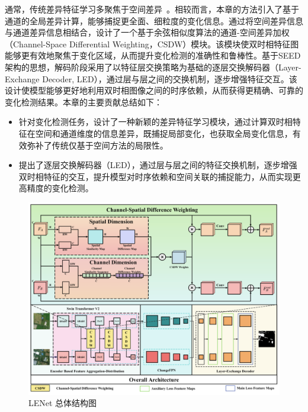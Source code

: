 通常，传统差异特征学习多聚焦于空间差异~\cite{dong_changeclip_2024, feng_change_2023, shi_deeply_2022}。相较而言，本章的方法引入了基于通道的全局差异计算，能够捕捉更全面、细粒度的变化信息。通过将空间差异信息与通道差异信息相结合，设计了一个基于余弦相似度算法的通道-空间差异加权（Channel-Space Differential Weighting，CSDW）模块。该模块使双时相特征图能够更有效地聚焦于变化区域，从而提升变化检测的准确性和鲁棒性。基于SEED架构的思想，解码阶段采用了以特征层交换策略为基础的逐层交换解码器（Layer-Exchange Decoder, LED），通过层与层之间的交换机制，逐步增强特征交互。该设计使模型能够更好地利用双时相图像之间的时序依赖，从而获得更精确、可靠的变化检测结果。本章的主要贡献总结如下：

\begin{itemize}
  \item 针对变化检测任务，设计了一种新颖的差异特征学习模块，通过计算双时相特征在空间和通道维度的信息差异，既捕捉局部变化，也获取全局变化信息，有效弥补了传统仅基于空间方法的局限性。
  \item 提出了逐层交换解码器（LED），通过层与层之间的特征交换机制，逐步增强双时相特征的交互，提升模型对时序依赖和空间关联的捕捉能力，从而实现更高精度的变化检测。
\end{itemize}


\begin{figure}[!htbp]
  \centering
  \includegraphics[width=\textwidth]{paper_figures/基于双时相遥感影像特征交互的变化检测算法研究/LENet/lenet.png}
  \caption{LENet 总体结构图}
  \label{fig:lenet}
\end{figure}

